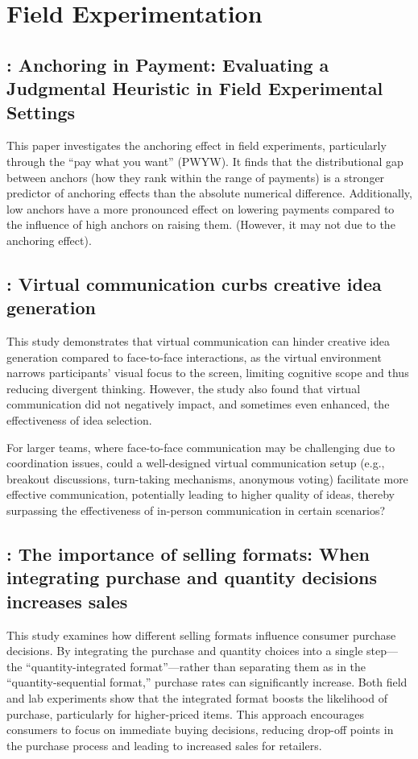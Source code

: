 \documentclass[11pt]{elegantbook}
\begin{document}
\chapter{Field Experimentation}

\section{\cite{jung2016anchoring}: Anchoring in Payment: Evaluating a Judgmental Heuristic in Field Experimental Settings}
This paper investigates the anchoring effect in field experiments, particularly through the “pay what you want” (PWYW). It finds that the distributional gap between anchors (how they rank within the range of payments) is a stronger predictor of anchoring effects than the absolute numerical difference. Additionally, low anchors have a more pronounced effect on lowering payments compared to the influence of high anchors on raising them. (However, it may not due to the anchoring effect).

\section{\cite{brucks2022virtual}: Virtual communication curbs creative idea generation}
This study demonstrates that virtual communication can hinder creative idea generation compared to face-to-face interactions, as the virtual environment narrows participants’ visual focus to the screen, limiting cognitive scope and thus reducing divergent thinking. However, the study also found that virtual communication did not negatively impact, and sometimes even enhanced, the effectiveness of idea selection.

For larger teams, where face-to-face communication may be challenging due to coordination issues, could a well-designed virtual communication setup (e.g., breakout discussions, turn-taking mechanisms, anonymous voting) facilitate more effective communication, potentially leading to higher quality of ideas, thereby surpassing the effectiveness of in-person communication in certain scenarios?

\section{\cite{duke2023importance}: The importance of selling formats: When integrating purchase and quantity decisions increases sales}
This study examines how different selling formats influence consumer purchase decisions. By integrating the purchase and quantity choices into a single step—the “quantity-integrated format”—rather than separating them as in the “quantity-sequential format,” purchase rates can significantly increase. Both field and lab experiments show that the integrated format boosts the likelihood of purchase, particularly for higher-priced items. This approach encourages consumers to focus on immediate buying decisions, reducing drop-off points in the purchase process and leading to increased sales for retailers.
\end{document}
